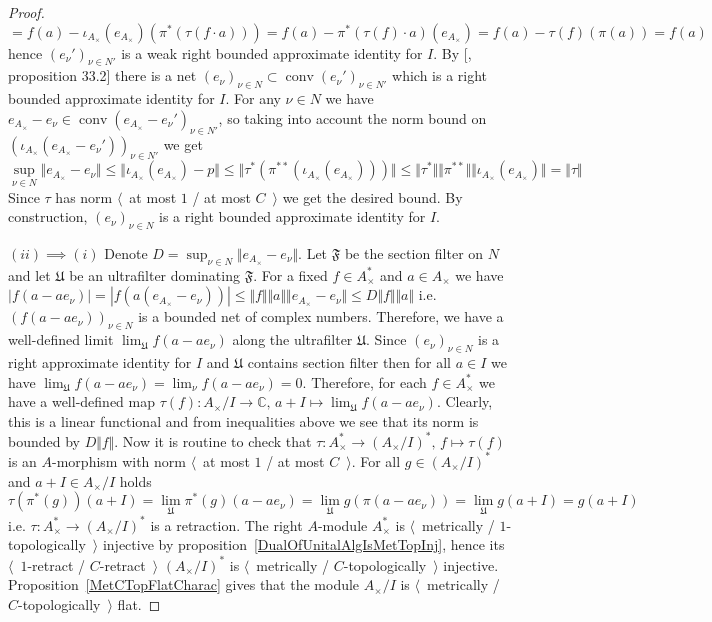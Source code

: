 \begin{proof}
$$$$
$$
=f(a)-\iota_{A_\times }(e_{A_\times })(\pi^*(\tau(f\cdot a)))
=f(a)-\pi^*(\tau(f)\cdot a)(e_{A_\times })
=f(a)-\tau(f)(\pi(a))
=f(a)
$$
hence ${(e_\nu')}_{\nu\in N'}$ is a weak right bounded approximate identity for
$I$. By [\cite{AppIdAndFactorInBanAlg}, proposition 33.2] there is a net
${(e_\nu)}_{\nu\in N}\subset\operatorname{conv}{(e_\nu')}_{\nu\in N'}$ which is
a right bounded approximate identity for $I$. For any $\nu\in N$ we have
$e_{A_\times }-e_\nu\in\operatorname{conv}{(e_{A_\times }-e_\nu')}_{\nu\in N'}$,
so taking into account the norm bound 
on ${(\iota_{A_\times }(e_{A_\times}-e_\nu'))}_{\nu\in N'}$ we get 
$$
\sup_{\nu\in N}\Vert e_{A_\times }-e_\nu\Vert
\leq\Vert \iota_{A_\times }(e_{A_\times })-p\Vert
\leq\Vert\tau^*(\pi^{**}(\iota_{A_\times }(e_{A_\times })))\Vert
\leq\Vert\tau^*\Vert\Vert\pi^{**}\Vert\Vert\iota_{A_\times }(e_{A_\times })\Vert
=\Vert\tau\Vert
$$
Since $\tau$ has norm $\langle$~at most $1$ / at most $C$~$\rangle$ we get the
desired bound. By construction, ${(e_\nu)}_{\nu\in N}$ is a right bounded
approximate identity for $I$.

$(ii)\implies (i)$ Denote $D=\sup_{\nu\in N}\Vert e_{A_\times }-e_\nu\Vert$.
Let $\mathfrak{F}$ be the section filter on $N$ and let $\mathfrak{U}$ be an
ultrafilter dominating $\mathfrak{F}$. For a fixed $f\in A_\times ^*$ 
and $a\in A_\times $ we have 
$|f(a-a e_\nu)|=|f(a(e_{A_\times }-e_\nu))|
\leq\Vert f\Vert\Vert a\Vert\Vert e_{A_\times }-e_\nu\Vert
\leq D\Vert f\Vert\Vert a\Vert$
i.e. ${(f(a-ae_\nu))}_{\nu\in N}$ is a bounded net of complex numbers. Therefore,
we have a well-defined limit $\lim_{\mathfrak{U}}f(a-ae_\nu)$ along the ultrafilter
$\mathfrak{U}$. Since ${(e_\nu)}_{\nu\in N}$ is a right approximate identity for
$I$ and $\mathfrak{U}$ contains section filter then for all $a\in I$ we have
$\lim_{\mathfrak{U}}f(a-ae_\nu)=\lim_{\nu}f(a-ae_\nu)=0$. Therefore, for each
$f\in A_\times ^*$ we have a well-defined map $\tau(f):A_\times /I\to
\mathbb{C},\, a+I\mapsto \lim_{\mathfrak{U}} f(a-ae_\nu)$. Clearly, this is a
linear functional and from inequalities above we see that its norm is bounded 
by $D\Vert f\Vert$. Now it is routine to check 
that $\tau:A_\times ^*\to {(A_\times /I)}^*,\, f\mapsto \tau(f)$ is 
an $A$-morphism with norm $\langle$~at most $1$ / at most $C$~$\rangle$. 
For all $g\in{(A_\times /I)}^*$ and $a+I\in A_\times /I$ holds
$$
\tau(\pi^*(g))(a+I)
=\lim_{\mathfrak{U}}\pi^*(g)(a-ae_\nu)
=\lim_{\mathfrak{U}} g(\pi(a-ae_\nu))
=\lim_{\mathfrak{U}} g(a+I)
=g(a+I)
$$
i.e. $\tau:A_\times ^*\to {(A_\times /I)}^*$ is a retraction. The right
$A$-module $A_\times ^*$ is $\langle$~metrically / $1$-topologically~$\rangle$
injective by proposition~\ref{DualOfUnitalAlgIsMetTopInj}, hence its
$\langle$~$1$-retract / $C$-retract~$\rangle$ ${(A_\times /I)}^*$ is
$\langle$~metrically / $C$-topologically~$\rangle$ injective. 
Proposition~\ref{MetCTopFlatCharac} gives that the
module $A_\times /I$ is $\langle$~metrically / $C$-topologically~$\rangle$ flat.
\end{proof}

